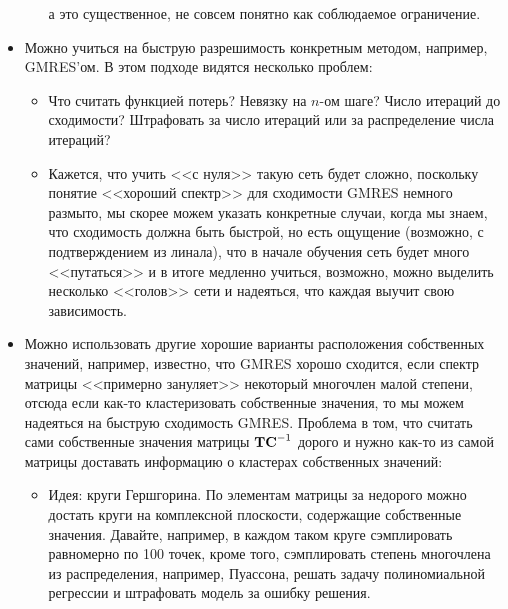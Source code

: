 \documentclass[a4paper, 12pt]{article}
\begin{document}
\begin{itemize}
\begin{itemize}
                а это существенное, не совсем понятно как соблюдаемое
                ограничение.
        \end{itemize}
    \item Можно учиться на быструю разрешимость конкретным
        методом, например, GMRES'ом. В этом подходе видятся 
        несколько проблем:
        \begin{itemize}
            \item Что считать функцией потерь?
                Невязку на $n$-ом шаге? Число итераций до сходимости?
                Штрафовать за число итераций или за распределение
                числа итераций?
            \item Кажется, что учить <<с нуля>> такую сеть
                будет сложно, поскольку понятие <<хороший спектр>>
                для сходимости GMRES немного размыто, мы скорее
                можем указать конкретные случаи, когда
                мы знаем, что сходимость должна быть быстрой, но
                есть ощущение (возможно, с подтверждением из линала), 
                что в начале обучения сеть будет
                много <<путаться>> и в итоге медленно учиться,
                возможно, можно выделить несколько <<голов>> сети
                и надеяться, что каждая выучит свою зависимость.
        \end{itemize}
    \item Можно использовать другие хорошие варианты расположения
        собственных значений, например, известно, что
        GMRES хорошо сходится, если спектр матрицы
        <<примерно зануляет>> некоторый многочлен малой степени,
        отсюда если как-то кластеризовать собственные значения,
        то мы можем надеяться на быструю сходимость GMRES. 
        Проблема в том, что считать сами собственные значения матрицы
        $\textbf T\textbf C^{-1}$ дорого и нужно как-то
        из самой матрицы доставать информацию о кластерах собственных
        значений:
        \begin{itemize}
            \item Идея: круги Гершгорина. По элементам матрицы
                за недорого можно достать круги на комплексной плоскости,
                содержащие собственные значения.
                Давайте, например, в каждом таком круге сэмплировать
                равномерно по 100 точек, кроме того, сэмплировать
                степень многочлена из распределения, например, Пуассона,
                решать задачу полиномиальной регрессии и штрафовать
                модель за ошибку решения. 

\end{itemize}
\end{itemize}
\end{document}
